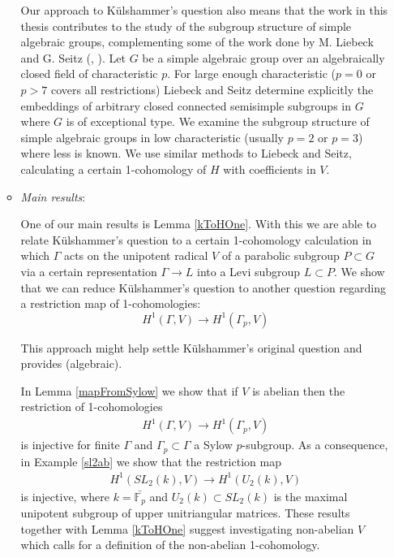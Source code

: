 \begin{itemize}
\begin{itemize}
		
		Our approach to K\"ulshammer's question also means that the work in this thesis contributes to the study of the subgroup structure of simple algebraic groups, complementing some of the work done by M. Liebeck and G. Seitz (\cite{liebeck1996reductive}, \cite{liebeck2004maximal}). Let $G$ be a simple algebraic group over an algebraically closed field of characteristic $p$. For large enough characteristic ($p=0$ or $p>7$ covers all restrictions) Liebeck and Seitz determine explicitly the embeddings of arbitrary closed connected semisimple subgroups in $G$ where $G$ is of exceptional type. We examine the subgroup structure of simple algebraic groups in low characteristic (usually $p=2$ or $p=3$) where less is known. We use similar methods to Liebeck and Seitz, calculating a certain 1-cohomology of $H$ with coefficients in $V$.
		
		

		\item \emph{Main results}:
		
		
		One of our main results is Lemma \ref{kToHOne}. With this we are able to relate K\"ulshammer's question to a certain 1-cohomology calculation in which $\Gamma$ acts on the unipotent radical $V$ of a parabolic subgroup $P \subset G$ via a certain representation $\Gamma \rightarrow L$ into a Levi subgroup $L \subset P$. We show that we can reduce K\"ulshammer's question to another question regarding a restriction map of 1-cohomologies:
		\begin{displaymath}
			H^1(\Gamma, V) \rightarrow H^1(\Gamma_p, V)
		\end{displaymath}
		
		
		This approach might help settle K\"ulshammer's original question and provides (algebraic).
		
		In Lemma \ref{mapFromSylow} we show that if $V$ is abelian then the restriction of 1-cohomologies
		\begin{eqnarray*}
			H^1(\Gamma, V)\rightarrow H^1(\Gamma_p, V)
		\end{eqnarray*}
		is injective for finite $\Gamma$ and $\Gamma_p\subset\Gamma$ a Sylow $p$-subgroup. As a consequence, in Example \ref{sl2ab} we show that the restriction map
		\begin{eqnarray*}
			H^1(SL_2(k), V) \rightarrow H^1(U_2(k), V)
		\end{eqnarray*}
		is injective, where $k = \bar{\mathbb{F}_p}$ and $U_2(k)\subset SL_2(k)$ is the maximal unipotent subgroup of upper unitriangular matrices. These results together with Lemma \ref{kToHOne} suggest investigating non-abelian $V$ which calls for a definition of the non-abelian 1-cohomology.


\end{itemize}
\end{itemize}
